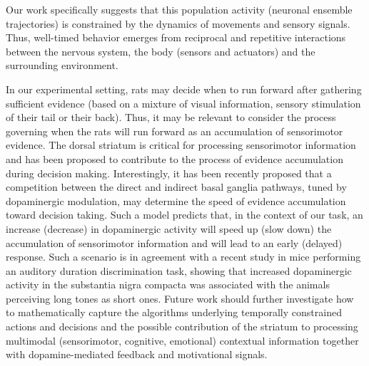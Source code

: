 Our work specifically suggests that this population activity (neuronal ensemble trajectories) is constrained by the dynamics of movements and sensory signals.
Thus, well-timed behavior emerges from reciprocal and repetitive interactions between the nervous system, the body (sensors and actuators) and the surrounding environment. 
\par
In our experimental setting, rats may decide when to run forward after gathering sufficient evidence (based on a mixture of visual information, sensory stimulation of their tail or their back).
Thus, it may be relevant to consider the process governing when the rats will run forward as an accumulation of sensorimotor evidence.
The dorsal striatum is critical for processing sensorimotor information\cite{Robbe2018CON} and has been proposed to contribute to the process of evidence accumulation during decision making\cite{Yartsev2018eLife}.
Interestingly, it has been recently proposed that a competition between the direct and indirect basal ganglia pathways, tuned by dopaminergic modulation, may determine the speed of evidence accumulation toward decision taking\cite{Dunovan2016FrontNeuro,Dunovan2019JNeurosci}.
Such a model predicts that, in the context of our task, an increase (decrease) in dopaminergic activity will speed up (slow down) the accumulation of sensorimotor information and will lead to an early (delayed) response.
Such a scenario is in agreement with a recent study in mice performing an auditory duration discrimination task, showing that increased dopaminergic activity in the substantia nigra compacta was associated with the animals perceiving long tones as short ones\cite{Soares2016Science}.
Future work should further investigate how to mathematically capture the algorithms underlying temporally constrained actions and decisions and the possible contribution of the striatum to processing multimodal (sensorimotor, cognitive, emotional) contextual information together with dopamine-mediated feedback and motivational signals.